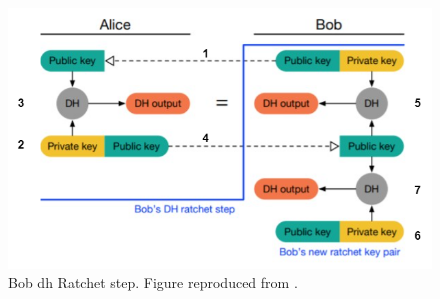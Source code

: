 \begin{figure}[hptb]
	\centering
	\includegraphics[scale=0.45]{Images/dr-bobRatchet.png}
	\caption{Bob \gls{dh} Ratchet step. Figure reproduced from \cite{dblRtcht}.}
	\label{fig:dh-bobRatchet}
\end{figure}

